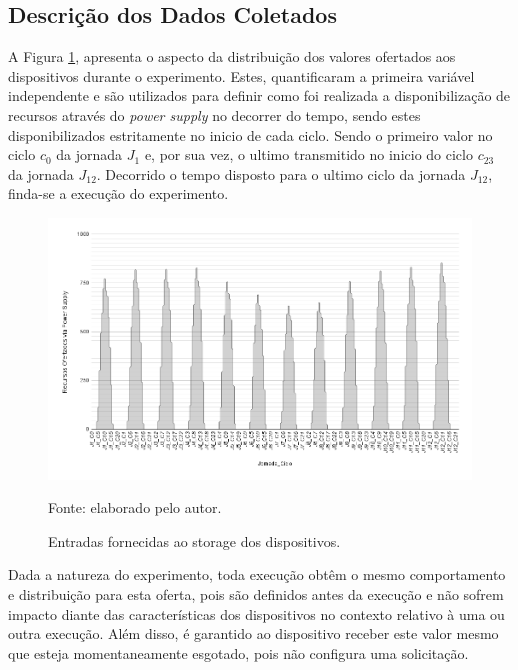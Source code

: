 \subsection{Descrição dos Dados Coletados}

A Figura \ref{fig:cap6valoresofertados}, apresenta o aspecto da distribuição dos valores ofertados aos dispositivos durante o experimento. Estes, quantificaram a primeira variável independente e são utilizados para definir como foi realizada a disponibilização de recursos através do \textit{power supply} no decorrer do tempo, sendo estes disponibilizados estritamente no inicio de cada ciclo. Sendo o primeiro valor no ciclo $c_{0}$ da jornada $J_1$ e, por sua vez, o ultimo transmitido no inicio do ciclo $c_{23}$ da jornada $J_{12}$. Decorrido o tempo disposto para o ultimo ciclo da jornada $J_{12}$, finda-se a execução do experimento.

\begin{figure}[H]
	\centering
	
	\caption{Entradas fornecidas ao storage dos dispositivos.} 
	\label{fig:cap6valoresofertados}
	\noindent\includegraphics[width=1\linewidth]{Imagens/cap6/cap6valoresofertados.png} 
	
	Fonte: elaborado pelo autor.
\end{figure}

Dada a natureza do experimento, toda execução obtêm o mesmo comportamento e distribuição para esta oferta, pois são definidos antes da execução e não sofrem impacto diante das características dos dispositivos no contexto relativo à uma ou outra execução. Além disso, é garantido ao dispositivo receber este valor mesmo que esteja momentaneamente esgotado, pois não configura uma solicitação.

